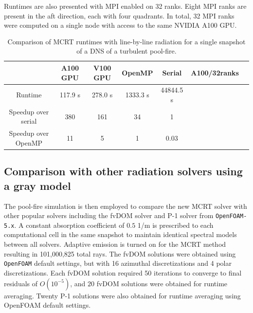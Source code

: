 Runtimes are also presented with MPI enabled on 32 ranks. Eight MPI ranks are present in the aft direction, each with four quadrants. In total, 32 MPI ranks were computed on a single node with access to the same NVIDIA A100 GPU.

\begin{table}
\caption{Comparison of MCRT runtimes with line-by-line radiation for a single snapshot of a DNS of a turbulent pool-fire.}
\label{table:PoolFireRuntimes}
\centering
\begin{tabular}{c c c c c c c} 
 \hline
 ~ & A100 GPU & V100 GPU & OpenMP & Serial & A100/32ranks \\ [0.5ex] 
 \hline
 Runtime & 117.9 s & 278.0 s & 1333.3 s & 44844.5 s & \\ 
 Speedup over serial & 380 & 161 & 34 & 1 & \\
 Speedup over OpenMP & 11 & 5 & 1 & 0.03 & \\
 \hline
\end{tabular}
\end{table}



\subsection{Comparison with other radiation solvers using a gray model}


The pool-fire simulation is then employed to compare the new MCRT solver with other popular solvers including the fvDOM solver and P-1 solver from \texttt{OpenFOAM-5.x}. A constant absorption coefficient of $0.5$ 1/m is prescribed to each computational cell in the same snapshot to maintain identical spectral models between all solvers. 
Adaptive emission is turned on for the MCRT method resulting in 101,000,825 total rays. The fvDOM solutions were obtained using \texttt{OpenFOAM} default settings, but with 16 azimuthal discretizations and 4 polar discretizations. 
Each fvDOM solution required 50 iterations to converge to final residuals of $O(10^{-5})$, and $20$ fvDOM solutions were obtained for runtime averaging. Twenty P-1 solutions were also obtained for runtime averaging using OpenFOAM default settings.

